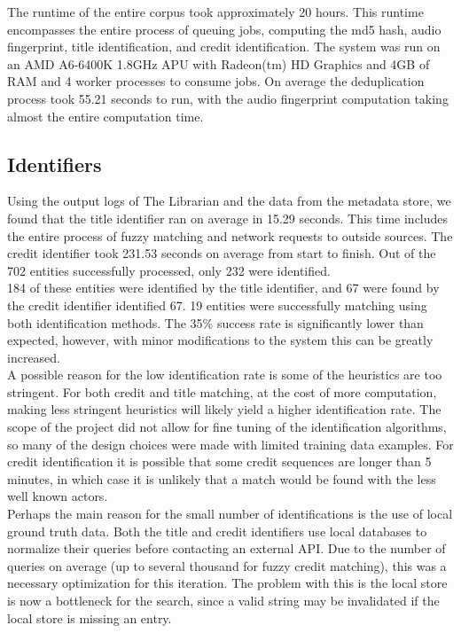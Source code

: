 \documentclass[paper=a4, fontsize=11pt]{scrartcl} %
\numberwithin{equation}{section} %
\numberwithin{figure}{section} %
\numberwithin{table}{section} %
\begin{document}
The runtime of the entire corpus took approximately 20 hours. This runtime encompasses the entire process of queuing jobs, computing the md5 hash, audio fingerprint, title identification, and credit identification. The system was run on an AMD A6-6400K 1.8GHz APU with Radeon(tm) HD Graphics and 4GB of RAM and 4 worker processes to consume jobs. On average the deduplication process took 55.21 seconds to run, with the audio fingerprint computation taking almost the entire computation time. \\

\subsection{Identifiers}
\label{sec:identifiers-performance}
Using the output logs of The Librarian and the data from the metadata store, we found that the title identifier ran on average in 15.29 seconds. This time includes the entire process of fuzzy matching and network requests to outside sources. The credit identifier took 231.53 seconds on average from start to finish. Out of the 702 entities successfully processed, only 232 were identified. \\

184 of these entities were identified by the title identifier, and 67 were found by the credit identifier identified 67. 19 entities were successfully matching using both identification methods. The 35\% success rate is significantly lower than expected, however, with minor modifications to the system this can be greatly increased. \\

A possible reason for the low identification rate is some of the heuristics are too stringent. For both credit and title matching, at the cost of more computation, making less stringent heuristics will likely yield a higher identification rate. The scope of the project did not allow for fine tuning of the identification algorithms, so many of the design choices were made with limited training data examples. For credit identification it is possible that some credit sequences are longer than 5 minutes, in which case it is unlikely that a match would be found with the less well known actors. \\

Perhaps the main reason for the small number of identifications is the use of local ground truth data. Both the title and credit identifiers use local databases to normalize their queries before contacting an external API. Due to the number of queries on average (up to several thousand for fuzzy credit matching), this was a necessary optimization for this iteration. The problem with this is the local store is now a bottleneck for the search, since a valid string may be invalidated if the local store is missing an entry. \\
\end{document}

